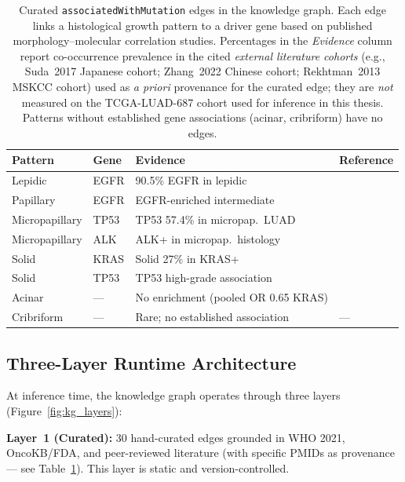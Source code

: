 \begin{table}[ht!]
\centering
\caption[Curated pattern--gene edges with literature provenance]{%
    Curated \texttt{associatedWithMutation} edges in the knowledge
    graph.  Each edge links a histological growth pattern to a driver
    gene based on published morphology--molecular correlation studies.
    Percentages in the \emph{Evidence} column report co-occurrence
    prevalence in the cited \emph{external literature cohorts}
    (e.g., Suda~2017 Japanese cohort; Zhang~2022 Chinese cohort;
    Rekhtman~2013 MSKCC cohort) used as \emph{a priori} provenance for
    the curated edge; they are \emph{not} measured on the
    TCGA-LUAD-687 cohort used for inference in this thesis.
    Patterns without established gene associations (acinar, cribriform)
    have no edges.}
\label{tab:kg_curated_edges}
\small
\begin{tabular}{l l l l}
\hline
\textbf{Pattern} & \textbf{Gene} & \textbf{Evidence} & \textbf{Reference} \\
\hline
Lepidic & EGFR & 90.5\% EGFR in lepidic &
  \cite{suda2017egfrlepidic} \\
Papillary & EGFR & EGFR-enriched intermediate &
  \cite{yoshizawa2011iaslcpattern} \\
Micropapillary & TP53 & TP53 57.4\% in micropap.\ LUAD &
  \cite{zhang2022micropaptp53} \\
Micropapillary & ALK & ALK+ in micropap.\ histology &
  \cite{yoshida2011alkhistology} \\
Solid & KRAS & Solid 27\% in KRAS+ &
  \cite{rekhtman2013krassolid} \\
Solid & TP53 & TP53 high-grade association &
  \cite{tcga2014luad} \\
\hline
Acinar & --- & No enrichment (pooled OR 0.65 KRAS) &
  \cite{ejso2019pooled} \\
Cribriform & --- & Rare; no established association & --- \\
\hline
\end{tabular}
\end{table}
 
\subsection{Three-Layer Runtime Architecture}
\label{sec:impl:ontology:runtime}
 
At inference time, the knowledge graph operates through three layers
(Figure~\ref{fig:kg_layers}):
 
\textbf{Layer~1 (Curated):} 30 hand-curated edges grounded in
WHO 2021, OncoKB/FDA, and peer-reviewed literature (with specific
PMIDs as provenance --- see Table~\ref{tab:kg_curated_edges}).
This layer is static and version-controlled.
 
